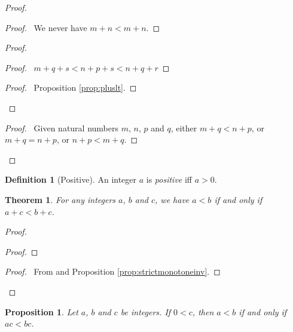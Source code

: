 \documentclass{book}
\let\qed\relax
\newtheorem{prop}[ax]{Proposition}
\newtheorem{thm}[ax]{Theorem}
\theoremstyle{definition}
\newtheorem{df}[ax]{Definition}
\begin{document}
\begin{proof}
	\pf
	\begin{proof}
		\pf\ We never have $m + n < m + n$.
	\end{proof}
	\begin{proof}
		\begin{proof}
			\pf\ $m + q + s < n + p + s < n + q + r$
		\end{proof}
		\begin{proof}
			\pf\ Proposition \ref{prop:pluslt}.
		\end{proof}
	\end{proof}
	\begin{proof}
		\pf\ Given natural numbers $m$, $n$, $p$ and $q$, either $m +q < n + p$, or $m + q = n + p$, or $n + p < m + q$.
	\end{proof}
	\qed
\end{proof}

\begin{df}[Positive]
An integer $a$ is \emph{positive} iff $a > 0$.
\end{df}

\begin{thm}
For any integers $a$, $b$ and $c$, we have $a < b$ if and only if $a + c < b + c$.
\end{thm}

\begin{proof}
\pf
{}
\begin{proof}
\end{proof}
\begin{proof}
	\pf\ From  and Proposition \ref{prop:strictmonotoneinv}.
\end{proof}
\qed
\end{proof}

\begin{prop}
Let $a$, $b$ and $c$ be integers. If $0 < c$, then $a < b$ if and only if $ac < bc$.
\end{prop}
\end{document}
